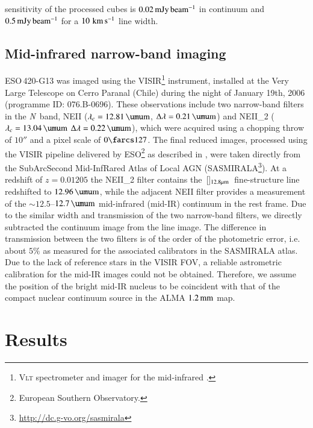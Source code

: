 \documentclass[longauth]{aa}
\newcommand{\kms}{\,\hbox{\hbox{km}\,\hbox{s}$^{-1}$}}
\newcommand{\neii}{\,\hbox{[\ion{Ne}{ii}]$_{\rm 12.8 \mu m}$}}
\def\micron{\hbox{$\umu$m}}
\begin{document}
sensitivity of the processed cubes is $0.02\, \rm{mJy\,beam^{-1}}$ in continuum and $0.5\, \rm{mJy\,beam^{-1}}$ for a $10\, \rm{\kms}$ line width.


\subsection{Mid-infrared narrow-band imaging}

ESO\,420-G13 was imaged using the VISIR\footnote{\textsc{Vlt} spectrometer and imager for the mid-infrared .} instrument, installed at the Very Large Telescope on Cerro Paranal (Chile) during the night of January 19th, 2006 (programme ID: 076.B-0696). These observations include two narrow-band filters in the \textit{N}~band, NEII ($\lambda_c = 12.81\, \rm{\micron}$, $\Delta \lambda = 0.21\, \rm{\micron}$) and NEII\_2 ($\lambda_c = 13.04\, \rm{\micron}$ $\Delta \lambda = 0.22\, \rm{\micron}$), which were acquired using a chopping throw of $10''$ and a pixel scale of $0\farcs127$. The final reduced images, processed using the VISIR pipeline delivered by ESO\footnote{European Southern Observatory.} as described in , were taken directly from the SubArcSecond Mid-InfRared Atlas of Local AGN (SASMIRALA\footnote{\url{http://dc.g-vo.org/sasmirala}}). At a redshift of $z = 0.01205$ the NEII\_2 filter contains the \neii \ fine-structure line redshifted to $12.96\, \rm{\micron}$, while the adjacent NEII filter provides a measurement of the $\sim 12.5$--$12.7\, \rm{\micron}$ mid-infrared (mid-IR) continuum in the rest frame. Due to the similar width and transmission of the two narrow-band filters, we directly subtracted the continuum image from the line image. The difference in transmission between the two filters is of the order of the photometric error, i.e. about $5\%$ as measured for the associated calibrators in the SASMIRALA atlas. Due to the lack of reference stars in the VISIR FOV, a reliable astrometric calibration for the mid-IR images could not be obtained. Therefore, we assume the position of the bright mid-IR nucleus to be coincident with that of the compact nuclear continuum source in the ALMA $1.2\, \rm{mm}$ map.



\section{Results}\label{results}
\end{document}
